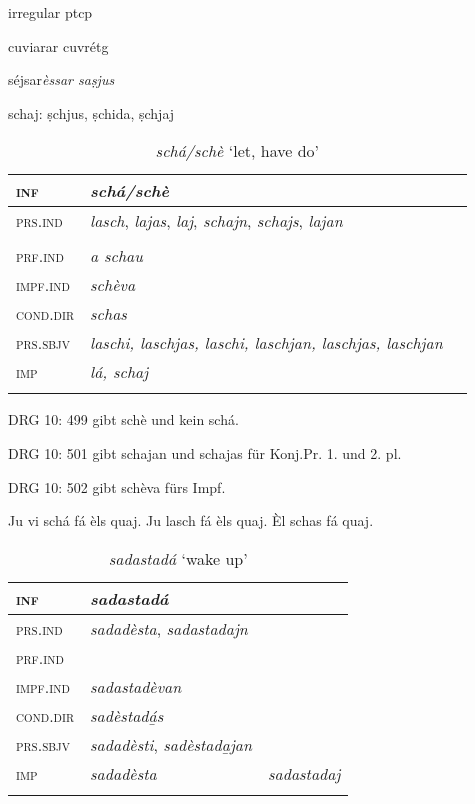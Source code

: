 irregular ptcp

cuviarar cuvrétg

séjsar\textit{èssar saṣjus} 

schaj: ṣchjus, ṣchida, ṣchjaj

\begin{table}
	\caption{\textit{schá/schè} `let, have do'}

	\begin{tabular}{lll}
		\lsptoprule
		\textsc{inf} & \textit{\textbf{schá/schè}}\\
		\midrule
		\textsc{prs.ind} & \textit{lasch}, \textit{lajas}, \textit{laj}, \textit{schajn}, \textit{schajs}, \textit{lajan}\\
		& \\
		\textsc{prf.ind} & \textit{a schau}\\
		\textsc{impf.ind} & \textit{schèva}\\
		\textsc{cond.dir} & \textit{schas}\\
		\textsc{prs.sbjv} 	& \textit{laschi, laschjas, laschi, laschjan, laschjas, laschjan}\\
		\textsc{imp}	& \textit{lá, schaj}\\
		\lspbottomrule
	\end{tabular}
\end{table}

DRG 10: 499 gibt schè und kein schá.

DRG 10: 501 gibt schajan und schajas für Konj.Pr. 1. und 2. pl.

DRG 10: 502 gibt schèva fürs Impf.

Ju vi schá fá èls quaj. Ju lasch fá èls quaj. Èl schas fá quaj.

\begin{table}
	\caption{\textit{\textit{sadastadá}} `wake up'}

	\begin{tabular}{lll}
		\lsptoprule
		\textsc{inf} & \textit{\textbf{sadastadá}}\\
		\midrule
		\textsc{prs.ind} & \textit{sadadèsta}, \textit{sadastadajn} \\
		\textsc{prf.ind} & \\
		\textsc{impf.ind} & \textit{sadastadèvan}\\
		\textsc{cond.dir} & \textit{sadèstadá̱s}\\
		\textsc{prs.sbjv} & \textit{sadadèsti}, \textit{sadèstada̱jan}\\
		\textsc{imp} & \textit{sadadèsta} & \textit{sadastadaj}\\
		\lspbottomrule
	\end{tabular}
\end{table}



